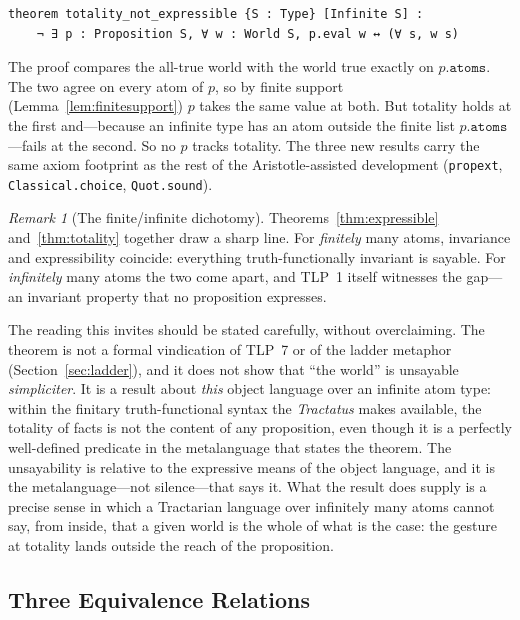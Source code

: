 \documentclass[jsl,bibother]{asl}
\theoremstyle{definition}
\theoremstyle{remark}
\newtheorem{remark}[theorem]{Remark}
\begin{document}
\begin{lstlisting}
theorem totality_not_expressible {S : Type} [Infinite S] :
    ¬ ∃ p : Proposition S, ∀ w : World S, p.eval w ↔ (∀ s, w s)
\end{lstlisting}

\noindent
The proof compares the all-true world with the world true exactly
on $p.\mathtt{atoms}$.  The two agree on every atom of $p$, so by
finite support (Lemma~\ref{lem:finitesupport}) $p$ takes the same
value at both.  But totality holds at the first and---because an
infinite type has an atom outside the finite list
$p.\mathtt{atoms}$---fails at the second.  So no $p$ tracks
totality.  The three new results carry the same axiom footprint as
the rest of the Aristotle-assisted development
(\texttt{propext}, \texttt{Classical.choice},
\texttt{Quot.sound}).

\begin{remark}[The finite/infinite dichotomy]
\label{rem:dichotomy}
Theorems~\ref{thm:expressible} and~\ref{thm:totality} together
draw a sharp line.  For \emph{finitely} many atoms, invariance
and expressibility coincide: everything truth-functionally
invariant is sayable.  For \emph{infinitely} many atoms the two
come apart, and TLP~1 itself witnesses the gap---an invariant
property that no proposition expresses.

The reading this invites should be stated carefully, without
overclaiming.  The theorem is not a formal vindication of TLP~7 or
of the ladder metaphor (Section~\ref{sec:ladder}), and it does not
show that ``the world'' is unsayable \emph{simpliciter}.  It is a
result about \emph{this} object language over an infinite atom
type: within the finitary truth-functional syntax the
\emph{Tractatus} makes available, the totality of facts is not the
content of any proposition, even though it is a perfectly
well-defined predicate in the metalanguage that states the
theorem.  The unsayability is relative to the expressive means of
the object language, and it is the metalanguage---not silence---that
says it.  What the result does supply is a precise sense in which a
Tractarian language over infinitely many atoms cannot say, from
inside, that a given world is the whole of what is the case: the
gesture at totality lands outside the reach of the proposition.
\end{remark}

\subsection{Three Equivalence Relations}
\label{sec:hierarchy}
\end{document}
